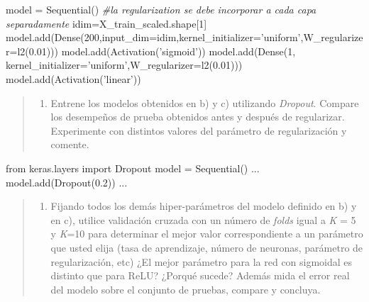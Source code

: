 \documentclass[11pt]{article}
\providecommand{\tightlist}{%
      \setlength{\itemsep}{0pt}\setlength{\parskip}{0pt}}
\newenvironment{Shaded}{}{}
\newcommand{\DecValTok}[1]{\textcolor[rgb]{0.25,0.63,0.44}{{#1}}}
\newcommand{\FloatTok}[1]{\textcolor[rgb]{0.25,0.63,0.44}{{#1}}}
\newcommand{\StringTok}[1]{\textcolor[rgb]{0.25,0.44,0.63}{{#1}}}
\newcommand{\CommentTok}[1]{\textcolor[rgb]{0.38,0.63,0.69}{\textit{{#1}}}}
\newcommand{\NormalTok}[1]{{#1}}
\newcommand{\ImportTok}[1]{{#1}}
\newcommand{\OperatorTok}[1]{\textcolor[rgb]{0.40,0.40,0.40}{{#1}}}
\begin{document}
\begin{Shaded}
\begin{Highlighting}[]
\NormalTok{model }\OperatorTok{=}\NormalTok{ Sequential()}
\CommentTok{#la regularization se debe incorporar a cada capa separadamente}
\NormalTok{idim}\OperatorTok{=}\NormalTok{X_train_scaled.shape[}\DecValTok{1}\NormalTok{]}
\NormalTok{model.add(Dense(}\DecValTok{200}\NormalTok{,input_dim}\OperatorTok{=}\NormalTok{idim,kernel_initializer}\OperatorTok{=}\StringTok{'uniform'}\NormalTok{,W_regularizer}\OperatorTok{=}\NormalTok{l2(}\FloatTok{0.01}\NormalTok{)))}
\NormalTok{model.add(Activation(}\StringTok{'sigmoid'}\NormalTok{))}
\NormalTok{model.add(Dense(}\DecValTok{1}\NormalTok{, kernel_initializer}\OperatorTok{=}\StringTok{'uniform'}\NormalTok{,W_regularizer}\OperatorTok{=}\NormalTok{l2(}\FloatTok{0.01}\NormalTok{)))}
\NormalTok{model.add(Activation(}\StringTok{'linear'}\NormalTok{))}
\end{Highlighting}
\end{Shaded}

    \begin{quote}
\begin{enumerate}
\def\labelenumi{\roman{enumi})}
\tightlist
\item
  Entrene los modelos obtenidos en b) y c) utilizando \emph{Dropout}.
  Compare los desempeños de prueba obtenidos antes y después de
  regularizar. Experimente con distintos valores del parámetro de
  regularización y comente.
\end{enumerate}
\end{quote}

\begin{Shaded}
\begin{Highlighting}[]
\ImportTok{from}\NormalTok{ keras.layers }\ImportTok{import}\NormalTok{ Dropout}
\NormalTok{model }\OperatorTok{=}\NormalTok{ Sequential()}
\NormalTok{...}
\NormalTok{model.add(Dropout(}\FloatTok{0.2}\NormalTok{))}
\NormalTok{...}
\end{Highlighting}
\end{Shaded}

    \begin{quote}
\begin{enumerate}
\def\labelenumi{\alph{enumi})}
\setcounter{enumi}{9}
\tightlist
\item
  Fijando todos los demás hiper-parámetros del modelo definido en b) y
  en c), utilice validación cruzada con un número de \emph{folds} igual
  a \emph{K} = 5 y \emph{K}=10 para determinar el mejor valor
  correspondiente a un parámetro que usted elija (tasa de aprendizaje,
  número de neuronas, parámetro de regularización, etc) ¿El mejor
  parámetro para la red con sigmoidal es distinto que para ReLU? ¿Porqué
  sucede? Además mida el error real del modelo sobre el conjunto de
  pruebas, compare y concluya.
\end{enumerate}
\end{quote}
\end{document}

